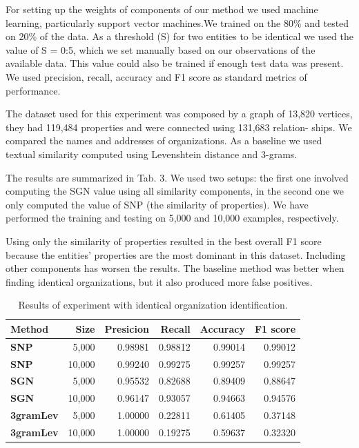 \documentclass{llncs}
\begin{document}
For setting up the weights of components of our method we used machine
learning, particularly support vector machines.We trained on the 80\% and tested
on 20\% of the data. As a threshold (S) for two entities to be identical we used the
value of S = 0:5, which we set manually based on our observations of the available
data. This value could also be trained if enough test data was present. We used
precision, recall, accuracy and F1 score as standard metrics of performance.

The dataset used for this experiment was composed by a graph of 13,820
vertices, they had 119,484 properties and were connected using 131,683 relation-
ships. We compared the names and addresses of organizations. As a baseline we
used textual similarity computed using Levenshtein distance and 3-grams.

The results are summarized in Tab. 3. We used two setups: the first one
involved computing the SGN value using all similarity components, in the second
one we only computed the value of SNP (the similarity of properties). We have
performed the training and testing on 5,000 and 10,000 examples, respectively.

Using only the similarity of properties resulted in the best overall F1 score
because the entities' properties are the most dominant in this dataset. Including
other components has worsen the results. The baseline method was better when
finding identical organizations, but it also produced more false positives.

\begin{table}[ht]
 \centering
 \caption{Results of experiment with identical organization identification.}
 \begin{tabular}{|l|r|r|r|r|r|}
\hline
Method & Size & \textbf{Presicion} & \textbf{Recall} & \textbf{Accuracy} & \textbf{F1 score} \\
\hline
\hline
\textbf{SNP} &5,000 &0.98981 &0.98812 &0.99014 &0.99012\\
\hline
\textbf{SNP} &10,000 &0.99240 &0.99275 &0.99257 &0.99257\\
\hline
\hline
\textbf{SGN} &5,000 &0.95532 &0.82688 &0.89409 &0.88647\\
\hline
\textbf{SGN} &10,000 &0.96147 &0.93057 &0.94663 &0.94576\\
\hline
\hline
\textbf{3gramLev} &5,000 &1.00000 &0.22811 &0.61405 &0.37148\\
\hline
\textbf{3gramLev} &10,000 &1.00000 &0.19275 &0.59637 &0.32320\\
\hline
	\end{tabular}
\end{table}	
\end{document}
